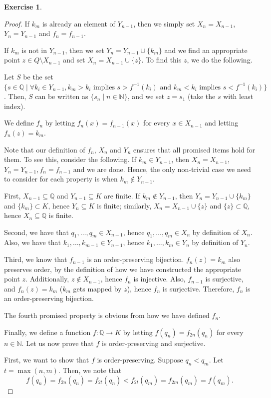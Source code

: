 \documentclass[11pt]{article}
\newcommand{\bbN}{\mathbb{N}}
\newcommand{\bbQ}{\mathbb{Q}}
\theoremstyle{definition}
\newtheorem{exercise}[theorem]{Exercise}
\numberwithin{equation}{subsection}
\begin{document}
\begin{exercise}
\begin{proof}
If $k_m$ is already an element of $Y_{n-1}$, then we simply set $X_n = X_{n-1}$, $Y_n = Y_{n-1}$ and $f_n = f_{n-1}$.

If $k_m$ is not in $Y_{n-1}$, then we set $Y_n = Y_{n-1}\cup\{k_m\}$ and we find an appropriate point $z\in Q\setminus X_{n-1}$ and set $X_n = X_{n-1}\cup\{z\}$. To find this $z$, we do the following.

Let $S$ be the set $\{s \in \bbQ \mid \forall k_i \in Y_{n-1}, k_m>k_i \text{ implies } s >f^{-1}(k_i) \text{ and } k_m<k_i \text{ implies } s<f^{-1}(k_i)\}$. Then, $S$ can be written as $\{s_n \mid n \in \bbN\}$, and we set $z = s_1$ (take the $s$ with least index). 

We define $f_n$ by letting $f_n(x) = f_{n-1}(x)$ for every $x\in X_{n-1}$ and letting $f_n(z) = k_m$.

Note that our definition of $f_n$, $X_n$ and $Y_n$ ensures that all promised items hold for them. To see this, consider the following. If $k_m \in Y_{n-1}$, then $X_n = X_{n-1}$, $Y_n = Y_{n-1}, f_n=f_{n-1}$ and we are done. Hence, the only non-trivial case we need to consider for each property is when $k_m \notin Y_{n-1}$.

First, $X_{n-1} \subseteq \bbQ$ and $Y_{n-1} \subseteq K$ are finite. If $k_m \notin Y_{n-1}$, then $Y_n = Y_{n-1}\cup\{k_m\}$ and $\{k_m\} \subset K$, hence $Y_n \subseteq K$ is finite; similarly, $X_n = X_{n-1}\cup\{z\}$ and $\{z\} \subset \bbQ$, hence $X_n \subseteq \bbQ$ is finite. 

Second, we have that $q_1,\dots,q_{m} \in X_{n-1}$, hence $q_1,\dots,q_{m} \in X_{n}$ by definition of $X_n$. Also, we have that $k_1,\dots,k_{m-1} \in Y_{n-1}$, hence $k_1,\dots,k_{m} \in Y_{n}$ by definition of $Y_n$.

Third, we know that $f_{n-1}$ is an order-preserving bijection. $f_n(z)=k_m$ also preserves order, by the definition of how we have constructed the appropriate point $z$. Additionally, $z \notin X_{n-1}$, hence $f_n$ is injective. Also, $f_{n-1}$ is surjective, and $f_n(z)=k_m$ ($k_m$ gets mapped by $z$), hence $f_n$ is surjective. Therefore, $f_n$ is an order-preserving bijection.

The fourth promised property is obvious from how we have defined $f_n$. 

Finally, we define a function $f\colon\mathbb{Q}\to K$ by letting $f(q_n) = f_{2n}(q_n)$ for every $n\in\mathbb{N}$. Let us now prove that $f$ is order-preserving and surjective.

First, we want to show that $f$ is order-preserving. Suppose $q_n<q_m$. Let $t=\max(n,m)$. Then, we note that
\[
f(q_n)=f_{2n}(q_n)=f_{2t}(q_n)<f_{2t}(q_m) = f_{2m}(q_m) = f(q_m).
\]


\end{proof}
\end{exercise}
\end{document}
